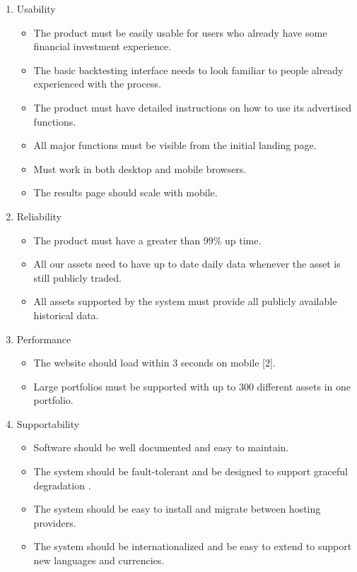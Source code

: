 \documentclass[main.tex]{subfiles}
\begin{document}
\begin{enumerate}
   \item Usability
   \begin{itemize}
     \item The product must be easily usable for users who already have some financial investment experience.
     \item The basic backtesting interface needs to look familiar to people already experienced with the process.
     \item The product must have detailed instructions on how to use its advertised functions.
     \item All major functions must be visible from the initial landing page.
     \item Must work in both desktop and mobile browsers.
     \item The results page should scale with mobile.
   \end{itemize}
   \item Reliability
      \begin{itemize}
     \item The product must have a greater than 99\% up time.
     \item All our assets need to have up to date daily data whenever the asset is still publicly traded.
     \item All assets supported by the system must provide all publicly available historical data.
   \end{itemize}
    \item Performance
      \begin{itemize}
     \item The website should load within 3 seconds on mobile [2].
     \item Large portfolios must be supported with up to 300 different assets in one portfolio.
   \end{itemize}
    \item Supportability
      \begin{itemize}
	 \item Software should be well documented and easy to maintain.
	 \item The system should be fault-tolerant and be designed to support graceful degradation \cite{gracefullDeg}.
	 \item The system should be easy to install and migrate between hosting providers.
	 \item The system should be internationalized and be easy to extend to support new languages and currencies.

\end{itemize}
\end{enumerate}
\end{document}
